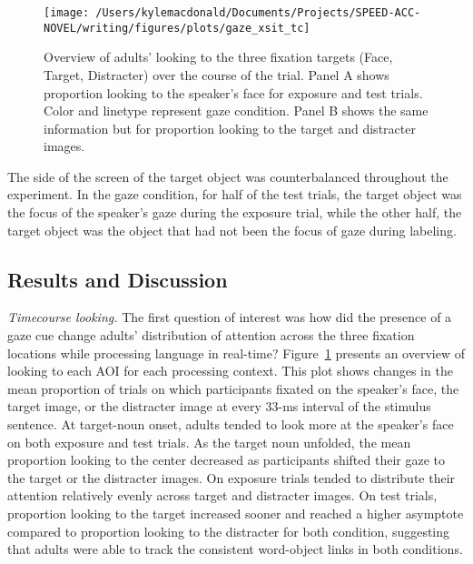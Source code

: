 \documentclass[man,floatsintext]{apa6}
\begin{document}
\begin{figure}[!t]

{\centering \texttt{[image: /Users/kylemacdonald/Documents/Projects/SPEED-ACC-NOVEL/writing/figures/plots/gaze\_xsit\_tc]} 

}

\caption{Overview of adults' looking to the three fixation targets (Face, Target, Distracter) over the course of the trial. Panel A shows proportion looking to the speaker's face for exposure and test trials. Color and linetype represent gaze condition. Panel B shows the same information but for proportion looking to the target and distracter images.}\label{fig:gaze-xsit-tc-plot}
\end{figure}

The side of the screen of the target object was counterbalanced
throughout the experiment. In the gaze condition, for half of the test
trials, the target object was the focus of the speaker's gaze during the
exposure trial, while the other half, the target object was the object
that had not been the focus of gaze during labeling.

\subsection{Results and Discussion}\label{results-and-discussion-1}

\emph{Timecourse looking.} The first question of interest was how did
the presence of a gaze cue change adults' distribution of attention
across the three fixation locations while processing language in
real-time? Figure~\ref{fig:gaze-xsit-tc-plot} presents an overview of
looking to each AOI for each processing context. This plot shows changes
in the mean proportion of trials on which participants fixated on the
speaker's face, the target image, or the distracter image at every 33-ms
interval of the stimulus sentence. At target-noun onset, adults tended
to look more at the speaker's face on both exposure and test trials. As
the target noun unfolded, the mean proportion looking to the center
decreased as participants shifted their gaze to the target or the
distracter images. On exposure trials tended to distribute their
attention relatively evenly across target and distracter images. On test
trials, proportion looking to the target increased sooner and reached a
higher asymptote compared to proportion looking to the distracter for
both condition, suggesting that adults were able to track the consistent
word-object links in both conditions.
\end{document}
